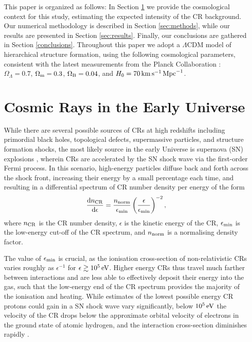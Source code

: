\documentclass[usenatbib]{mn2e}
\newcommand{\kms}{\,\mathrm{km}\,\mathrm{s}^{-1}}
\newcommand{\Mpc}{\,{\rm Mpc}}
\newcommand{\ev}{\,{\rm eV}}
\begin{document}
This paper is organized as follows: In Section \ref{sec:context} we provide the cosmological context for this study, estimating the expected intensity of the CR background. Our numerical methodology is described in Section \ref{sec:methods}, while our results are presented in Section \ref{sec:results}.  
Finally, our conclusions are gathered in Section \ref{conclusions}. Throughout this paper we adopt a $\Lambda$CDM model of hierarchical structure formation, using the following cosmological parameters, consistent with the latest measurements from the Planck Collaboration \citep{PlanckParams2015}: $\Omega_{\Lambda} = 0.7$, $\Omega_{\rm m} = 0.3$, $\Omega_{\rm B} = 0.04$, and $H_0 = 70 \kms \Mpc^{-1}$.

\section{Cosmic Rays in the Early Universe}
\label{sec:context}
While there are several possible sources of CRs at high redshifts including primordial black holes, topological defects, supermassive particles, and structure formation shocks, the most likely source in the early Universe is supernova (SN) explosions \citep[e.g.,][]{GinzburgSyrovatskii1969,BiermannSigl2001,Stanev2004,Pfrommeretal2006}, wherein CRs are accelerated by the SN shock wave via the first-order Fermi process.  
In this scenario, high-energy particles diffuse back and forth across the shock front, increasing their energy by a small percentage each time, and resulting in a differential spectrum of CR number density per energy \citep{Longair1994} of the form
\begin{equation}
    \frac{{\rm d}n_{\rm \small CR}}{{\rm d}\epsilon} = \frac{n_{\rm norm}}{\epsilon_{\rm min}}
    \left( \frac{\epsilon}{\epsilon_{\rm min}} \right)^{-2},
\end{equation}
where $n_{\rm \small CR}$ is the CR number density, $\epsilon$ is the kinetic energy of the CR, $\epsilon_{\rm min}$ is the low-energy cut-off of the CR spectrum, and $n_{\rm norm}$ is a normalising density factor. 

The value of $\epsilon_{\rm min}$ is crucial, as the ionisation cross-section of non-relativistic CRs varies roughly as $\epsilon^{-1}$ for $\epsilon \gtrsim 10^5\ev$. 
Higher energy CRs thus travel much farther between interactions and are less able to effectively deposit their energy into the gas, such that the low-energy end of the CR spectrum provides the majority of the ionisation and heating.  
While estimates of the lowest possible energy CR protons could gain in a SN shock wave vary significantly, below $10^5\ev$ the velocity of the CR drops below the approximate orbital velocity of electrons in the ground state of atomic hydrogen, and the interaction cross-section diminishes rapidly \citep{Schlickeiser2002}. 
\end{document}
